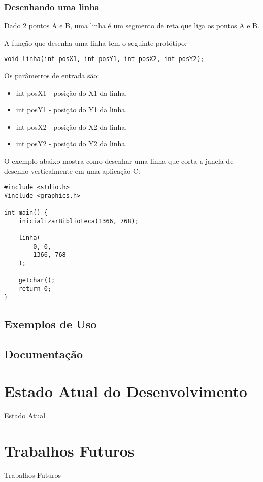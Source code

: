 \documentclass[12pt, %
openright,
oneside, %
a4paper,    %
brazil]{facom-ufu-abntex2}
\begin{document}
\subsubsection{Desenhando uma linha}
Dado 2 pontos A e B, uma linha é um segmento de reta que liga os pontos A e B.

A função que desenha uma linha tem o seguinte protótipo:

\begin{verbatim}
void linha(int posX1, int posY1, int posX2, int posY2);
\end{verbatim}

Os parâmetros de entrada são:

\begin{itemize}
    \item int posX1 - posição do X1 da linha.
    \item int posY1 - posição do Y1 da linha.
    \item int posX2 - posição do X2 da linha.
    \item int posY2 - posição do Y2 da linha.
\end{itemize}

O exemplo abaixo mostra como desenhar uma linha que corta a janela de desenho verticalmente em uma aplicação C:

\begin{verbatim}
#include <stdio.h>
#include <graphics.h>

int main() {
    inicializarBiblioteca(1366, 768);

    linha(
        0, 0,
        1366, 768
    );

    getchar();
    return 0;
}
\end{verbatim}

\subsection{Exemplos de Uso}

\subsection{Documentação}

\section{Estado Atual do Desenvolvimento}
Estado Atual

\section{Trabalhos Futuros}
Trabalhos Futuros
\end{document}
